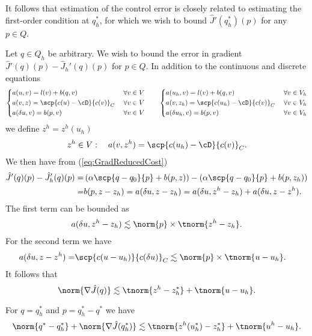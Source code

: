 It follows that estimation of the control error is closely related to estimating the first-order condition at $q^*_h$, for which we wish to bound $\hat J'(q_h^*)(p)$ for any $p\in Q$.

Let $q\in Q_h$ be arbitrary. We wish to bound the error in gradient $\hat J'(q)(p) - \hat J_h'(q)(p)$ for $p\in Q$. In addition to the continuous and discrete equations
%
\begin{align*}
%
\left\{
\begin{aligned}
&a(u, v) = l(v) + b(q,v)&\; \forall v\in V\\
&a(v,z) = \scp{c(u)-\cD}{c(v)}_C&\; \forall v\in V\\
&a(\delta u,v) = b(p,v)&\; \forall v\in V
\end{aligned}
\right.
%
\qquad
%
\left\{
\begin{aligned}
&a(u_h, v) = l(v) + b(q,v)&\; \forall v\in V_h\\
&a(v,z_h) = \scp{c(u_h)-\cD}{c(v)}_C&\; \forall v\in V_h\\
&a(\delta u_h,v) = b(p,v)&\; \forall v\in V_h
\end{aligned}
\right.
%
\end{align*}
%
we define $z^h=z^h(u_h)$
%
\begin{align*}
z^h\in V:\quad a(v,z^h) = \scp{c(u_h)-\cD}{c(v)}_C.
\end{align*}
%
We then have from (\ref{eq:GradReducedCost})
%
\begin{align*}
\hat J'(q)(p) - \hat J_h'(q)(p) =& \left( \alpha\scp{q-q_0}{p} + b(p,z)\right) - \left( \alpha\scp{q-q_0}{p} + b(p,z_h)\right)\\
=& b(p,z - z_h) = a(\delta u,z - z_h) = a(\delta u,z^h - z_h) + a(\delta u,z - z^h).
\end{align*}
%
The first term can be bounded as
%
\begin{align*}
a(\delta u,z^h - z_h) \lesssim  \norm{p} \times\tnorm{z^h - z_h}.
\end{align*}
%
For the second term we have
%
\begin{align*}
a(\delta u,z - z^h) =& \scp{c(u-u_h)}{c(\delta u)}_C \lesssim \norm{p} \times\tnorm{u - u_h}.
\end{align*}
%
It follows that
%
\begin{equation}\label{eq:}
\norm{\nabla \hat J(q)} \lesssim \tnorm{z^h - z^*_h} + \tnorm{u - u_h}.
\end{equation}


For $q=q_h^*$ and $p=q_h^*-q^*$ we have
%
\begin{equation}\label{eq:}
\norm{q^*-q^*_h} + \norm{\nabla \hat J(q^*_h)} \lesssim \tnorm{z^h(u^*_h) - z^*_h} + \tnorm{u^h - u_h}.
\end{equation}
%



\printbibliography[title=References Section~\thesection]


